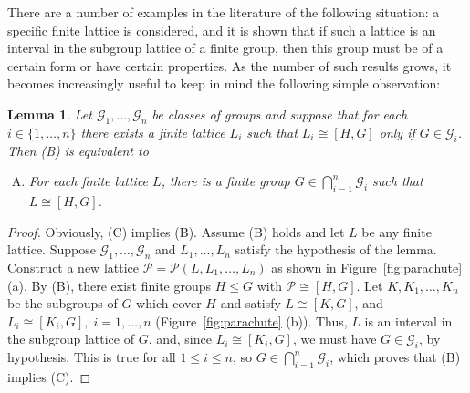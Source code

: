 \documentclass[cm,dissertation,actual,final]{uhthesis}
\theoremstyle{plain}
\newtheorem{lemma}[theorem]{Lemma}
\theoremstyle{definition}
\theoremstyle{remark}
\numberwithin{theorem}{section}
\numberwithin{claim}{chapter}
\numberwithin{equation}{section}
\numberwithin{conjecture}{chapter}
\newcommand{\<}{\ensuremath{\langle}}
\renewcommand{\>}{\ensuremath{\rangle}}
\renewcommand{\leq}{\ensuremath{\leqslant}}
\newcommand{\0}{\ensuremath{\mathbf{0}}}
\newcommand{\1}{\ensuremath{\mathbf{1}}}
\newcommand{\2}{\ensuremath{\mathbf{2}}}
\newcommand{\3}{\ensuremath{\mathbf{3}}}
\newcommand{\4}{\ensuremath{\mathbf{4}}}
\newcommand{\5}{\ensuremath{\mathbf{5}}}
\newcommand{\sG}{\ensuremath{\mathscr{G}}}
\newcommand{\sP}{\ensuremath{\mathscr{P}}}
\begin{document}
There are a number of examples in the literature of the following situation: a specific
finite lattice is considered, and it is shown that if
such a lattice is an interval in the subgroup lattice of a finite group, then this
group must be of a certain form or have certain properties.
As the number of such results grows, it becomes increasingly useful to keep in
mind the following simple observation: 
\begin{lemma}
\label{lemma-wjd-1}
Let $\sG_1, \dots, \sG_n$ be classes of groups and  
suppose that for each $i\in \{1, \dots, n\}$ there exists a finite lattice $L_i$
such that
$L_i \cong [H, G]$ only if $G\in \sG_i$.
Then (B) is equivalent to
\begin{enumerate}[(C)]
\item For each finite lattice $L$, there is a finite group $G \in
  \bigcap\limits_{i=1}^n \sG_i$ such that $L \cong [H,G]$.
\end{enumerate}
\end{lemma}
\begin{proof}
Obviously, (C) implies (B).  Assume (B) holds and let $L$ be any finite lattice.  Suppose 
$\sG_1, \dots, \sG_n$ and $L_1, \dots, L_n$ satisfy the hypothesis of the lemma.
Construct a new lattice $\sP = \sP(L, L_1, \dots, L_n)$ as shown in
Figure~\ref{fig:parachute} (a).
By (B), there exist finite groups $H \leq G$ with $\sP \cong [H,G]$.  
Let $K, K_1, \dots, K_n$ be the subgroups of $G$ 
which cover $H$ and satisfy $L \cong [K, G]$, and 
$L_i \cong [K_i, G],\; i=1, \dots, n$ (Figure~\ref{fig:parachute} (b)).
Thus, $L$ is an interval in the subgroup lattice of $G$, and,
since $L_i \cong [K_i, G]$, we must have $G\in \sG_i$, by hypothesis.  This is true
for all $1\leq i \leq n$, so $G \in \bigcap\limits_{i=1}^n \sG_i$, which proves that
(B) implies (C).
\end{proof}
\end{document}
